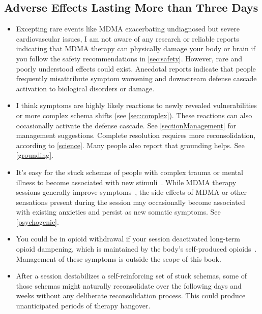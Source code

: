 \documentclass[11pt,oneside]{book}
\let\cite\parencite
\begin{document}
\subsection{Adverse Effects Lasting More than Three Days}
\begin{itemize}
    \item Excepting rare events like MDMA exacerbating undiagnosed but severe cardiovascular issues, I am not aware of any research or reliable reports indicating that MDMA therapy can physically damage your body or brain if you follow the safety recommendations in \cref{sec:safety}. However, rare and poorly understood effects could exist. Anecdotal reports indicate that people frequently misattribute symptom worsening and downstream defense cascade activation to biological disorders or damage.
    \item I think symptoms are highly likely reactions to newly revealed vulnerabilities or more complex schema shifts (see \cref{sec:complex}). These reactions can also occasionally activate the defense cascade. See \cref{sectionManagement} for management suggestions. Complete resolution requires more reconsolidation, according to \cref{science}. Many people also report that grounding helps. See \cref{grounding}.
    \item It's easy for the stuck schemas of people with complex trauma or mental illness to become associated with new stimuli~\cite{berghBSTS}. While MDMA therapy sessions generally improve symptoms~\cite{mitchellMDMAClinicalTrial,mitchellMDMAClinicalTrial2}, the side effects of MDMA or other sensations present during the session may occasionally become associated with existing anxieties and persist as new somatic symptoms. See \cref{psychogenic}.
    \item You could be in opioid withdrawal if your session deactivated long-term opioid dampening, which is maintained by the body's self-produced opioids~\cite{laniusNeurobiology}. Management of these symptoms is outside the scope of this book.
    \item After a session destabilizes a self-reinforcing set of stuck schemas, some of those schemas might naturally reconsolidate over the following days and weeks without any deliberate reconsolidation process. This could produce unanticipated periods of therapy hangover.
\end{itemize}
\end{document}

